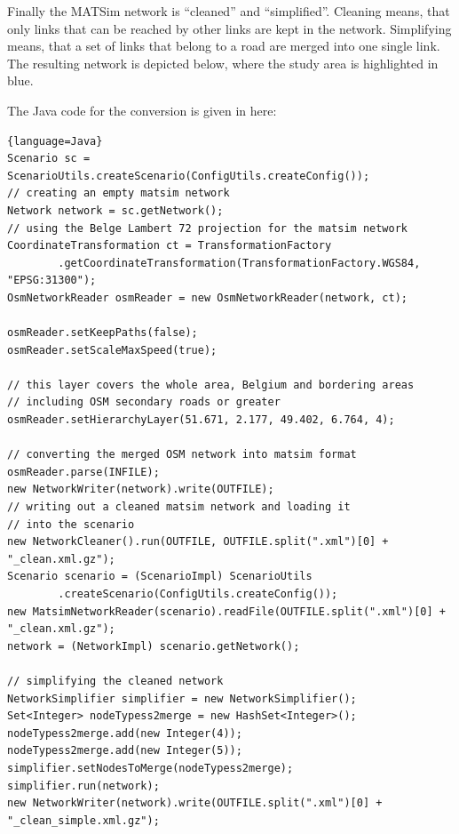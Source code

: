 Finally the MATSim network is “cleaned” and “simplified”. Cleaning  means, that only links that can be reached by other links are kept in  the network. Simplifying means, that a set of links that belong to a  road are merged into one single link. The resulting network is depicted  below, where the study area is highlighted in blue.

The Java code for the conversion is given in here:
\begin{lstlisting}{language=Java}
Scenario sc = ScenarioUtils.createScenario(ConfigUtils.createConfig());
// creating an empty matsim network
Network network = sc.getNetwork();
// using the Belge Lambert 72 projection for the matsim network
CoordinateTransformation ct = TransformationFactory
        .getCoordinateTransformation(TransformationFactory.WGS84, "EPSG:31300");
OsmNetworkReader osmReader = new OsmNetworkReader(network, ct);

osmReader.setKeepPaths(false);
osmReader.setScaleMaxSpeed(true);

// this layer covers the whole area, Belgium and bordering areas
// including OSM secondary roads or greater
osmReader.setHierarchyLayer(51.671, 2.177, 49.402, 6.764, 4);

// converting the merged OSM network into matsim format
osmReader.parse(INFILE);
new NetworkWriter(network).write(OUTFILE);
// writing out a cleaned matsim network and loading it
// into the scenario
new NetworkCleaner().run(OUTFILE, OUTFILE.split(".xml")[0] + "_clean.xml.gz");
Scenario scenario = (ScenarioImpl) ScenarioUtils
        .createScenario(ConfigUtils.createConfig());
new MatsimNetworkReader(scenario).readFile(OUTFILE.split(".xml")[0] + "_clean.xml.gz");
network = (NetworkImpl) scenario.getNetwork();

// simplifying the cleaned network
NetworkSimplifier simplifier = new NetworkSimplifier();
Set<Integer> nodeTypess2merge = new HashSet<Integer>();
nodeTypess2merge.add(new Integer(4));
nodeTypess2merge.add(new Integer(5));
simplifier.setNodesToMerge(nodeTypess2merge);
simplifier.run(network);
new NetworkWriter(network).write(OUTFILE.split(".xml")[0] + "_clean_simple.xml.gz");
\end{lstlisting}




